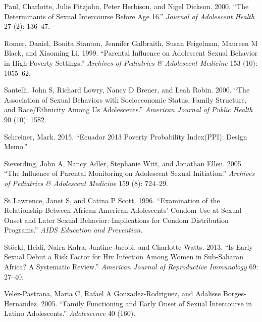 \documentclass[
]{article}
\newlength{\cslhangindent}
\newenvironment{cslreferences}%
  {\setlength{\parindent}{0pt}%
  \everypar{\setlength{\hangindent}{\cslhangindent}}\ignorespaces}%
  {\par}
\begin{document}
\begin{cslreferences}
\leavevmode\hypertarget{ref-paul2000determinants}{}%
Paul, Charlotte, Julie Fitzjohn, Peter Herbison, and Nigel Dickson.
2000. ``The Determinants of Sexual Intercourse Before Age 16.''
\emph{Journal of Adolescent Health} 27 (2): 136--47.

\leavevmode\hypertarget{ref-romer1999parental}{}%
Romer, Daniel, Bonita Stanton, Jennifer Galbraith, Susan Feigelman,
Maureen M Black, and Xiaoming Li. 1999. ``Parental Influence on
Adolescent Sexual Behavior in High-Poverty Settings.'' \emph{Archives of
Pediatrics \& Adolescent Medicine} 153 (10): 1055--62.

\leavevmode\hypertarget{ref-santelli2000association}{}%
Santelli, John S, Richard Lowry, Nancy D Brener, and Leah Robin. 2000.
``The Association of Sexual Behaviors with Socioeconomic Status, Family
Structure, and Race/Ethnicity Among Us Adolescents.'' \emph{American
Journal of Public Health} 90 (10): 1582.

\leavevmode\hypertarget{ref-schreiner2015ecuador}{}%
Schreiner, Mark. 2015. ``Ecuador 2013 Poverty Probability Index(PPI):
Design Memo.''

\leavevmode\hypertarget{ref-sieverding2005influence}{}%
Sieverding, John A, Nancy Adler, Stephanie Witt, and Jonathan Ellen.
2005. ``The Influence of Parental Monitoring on Adolescent Sexual
Initiation.'' \emph{Archives of Pediatrics \& Adolescent Medicine} 159
(8): 724--29.

\leavevmode\hypertarget{ref-st1996examination}{}%
St Lawrence, Janet S, and Catina P Scott. 1996. ``Examination of the
Relationship Between African American Adolescents' Condom Use at Sexual
Onset and Later Sexual Behavior: Implications for Condom Distribution
Programs.'' \emph{AIDS Education and Prevention}.

\leavevmode\hypertarget{ref-stockl2013early}{}%
Stöckl, Heidi, Naira Kalra, Jantine Jacobi, and Charlotte Watts. 2013.
``Is Early Sexual Debut a Risk Factor for Hiv Infection Among Women in
Sub-Saharan Africa? A Systematic Review.'' \emph{American Journal of
Reproductive Immunology} 69: 27--40.

\leavevmode\hypertarget{ref-velez2005family}{}%
Velez-Pastrana, Maria C, Rafael A Gonzadez-Rodriguez, and Adalisse
Borges-Hernandez. 2005. ``Family Functioning and Early Onset of Sexual
Intercourse in Latino Adolescents.'' \emph{Adolescence} 40 (160).
\end{cslreferences}
\end{document}
